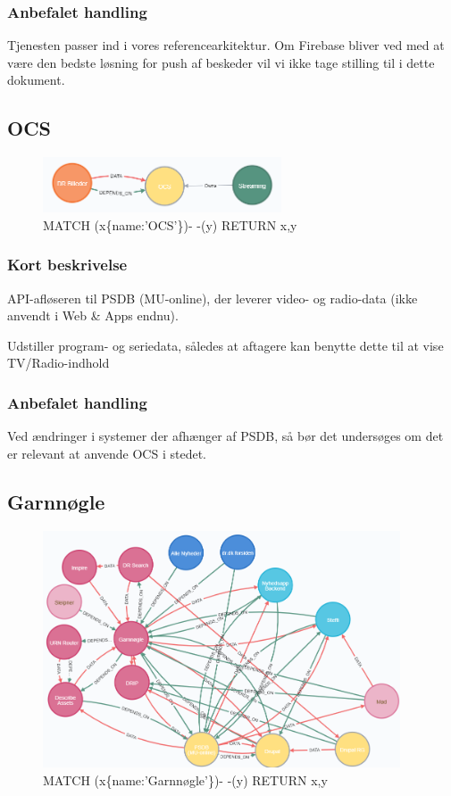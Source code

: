 \documentclass{article}
\begin{document}
\subsubsection{Anbefalet handling}
Tjenesten passer ind i vores referencearkitektur. Om Firebase bliver ved med at være den bedste løsning for push af beskeder vil vi ikke tage stilling til i dette dokument.


\subsection{OCS}
\begin{figure}[h]
\includegraphics[width=200pt]{OCS.PNG}
\caption{MATCH (x\{name:'OCS'\})- -(y) RETURN x,y}
\end{figure}
\subsubsection{Kort beskrivelse}
API-afløseren til PSDB (MU-online), der leverer video- og radio-data (ikke anvendt i Web \& Apps endnu).

Udstiller program- og seriedata, således at aftagere kan benytte dette til at vise TV/Radio-indhold
\subsubsection{Anbefalet handling}
Ved ændringer i systemer der afhænger af PSDB, så bør det undersøges om det er relevant at anvende OCS i stedet.



\subsection{Garnnøgle}
\begin{figure}[h]
\includegraphics[width=300pt]{Garnnoegle.PNG}
\caption{MATCH (x\{name:'Garnnøgle'\})- -(y) RETURN x,y}
\end{figure}
\end{document}
